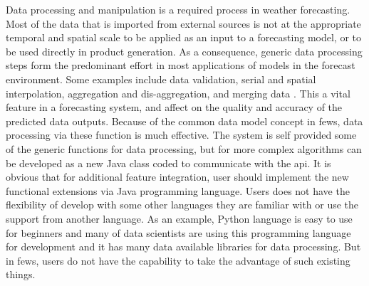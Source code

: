 Data processing and manipulation is a required process in weather forecasting. Most of the data that is imported from external sources is not at the appropriate temporal and spatial scale to be applied as an input to a forecasting model, or to be used directly in product generation. As a consequence, generic data processing steps form the predominant effort in most applications of models in the forecast environment. Some examples include data validation, serial and spatial interpolation, aggregation and dis-aggregation, and merging data \cite{Werner2013TheSystem}. This a vital feature in a forecasting system, and affect on the quality and accuracy of the predicted data outputs. Because of the common data model concept in \acrshort{fews}, data processing via these function is much effective. The system is self provided some of the generic functions for data processing, but for more complex algorithms can be developed as a new Java class coded to communicate with the \acrfull{api}. It is obvious that for additional feature integration, user should implement the new functional extensions via Java programming language. Users does not have the flexibility of develop with some other languages they are familiar with or use the support from another language. As an example, Python language is easy to use for beginners and many of data scientists are using this programming language for development and it has many data available libraries for data processing. But in \acrshort{fews}, users do not have the capability to take the advantage of such existing things.

